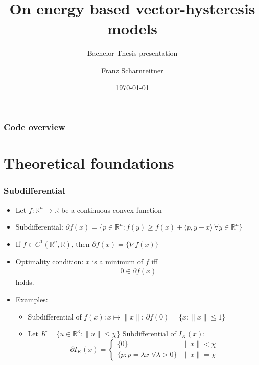 \documentclass[utf8,aspectratio=169,ngerman,english]{beamer}
\begin{document}
\title{On energy based vector-hysteresis models}

\subtitle{Bachelor-Thesis presentation}

\author{Franz Scharnreitner}



\date{\today}

\maketitle


\begin{frame}
\frametitle{Code overview}
 \tableofcontents
\end{frame}

\section{Theoretical foundations}
\begin{frame}
 \frametitle{Subdifferential \cite{rockafellar1997convex}}

 \begin{itemize}
    \item Let $f: \mathbb R^n \to \mathbb R$ be a continuous convex function
    \item Subdifferential: $\partial f(x) = \{p \in \mathbb R^n: f(y) \geq f(x) + \langle p, y - x \rangle \, \forall y \in \mathbb R^n\}$
    \item If $f \in C^1(\mathbb R^n,\mathbb R)$, then $\partial f(x) = \{\nabla f(x)\}$
     \item Optimality condition: $x$ is a minimum of $f$ iff \begin{align}
                                                        0 \in \partial f(x)
                                                       \end{align}
        holds.
    \item Examples:
     \begin{itemize}
      \item Subdifferential of $f(x): x \mapsto \|x\|$: $\partial f(0) = \{x : \|x\| \leq 1 \}$
      \item Let $K = \{u \in \mathbb R^3 : \|u\| \leq \chi \} $ Subdifferential of $I_K(x):$
      $$\partial I_K(x) = \begin{cases}\{0\} & \|x\| < \chi \\ \{p : p = \lambda x \,\, \forall \lambda > 0 \} & \|x\| = \chi \end{cases}$$
     \end{itemize}



 \end{itemize} 

\end{frame}
\end{document}
